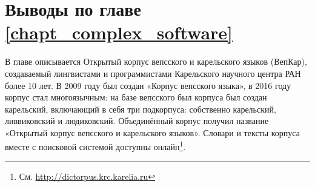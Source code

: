 ﻿\section{Выводы по главе \ref{chapt_complex_software}} \label{sect_conclusion_complex_software}

В главе описывается Открытый корпус вепсского и карельского языков (ВепКар), создаваемый лингвистами и программистами  Карельского научного центра РАН более 10 лет.  В 2009 году был создан «Корпус вепсского языка», в 2016 году корпус стал многоязычным: на базе вепсского был корпуса был создан карельский, включающий в себя три подкорпуса: собственно карельский, ливвиковский и людиковский.  Объединённый корпус получил название «Открытый корпус вепсского и карельского языков». Словари и тексты корпуса вместе с поисковой системой доступны онлайн\footnote{ См. \url{http://dictorpus.krc.karelia.ru}}.